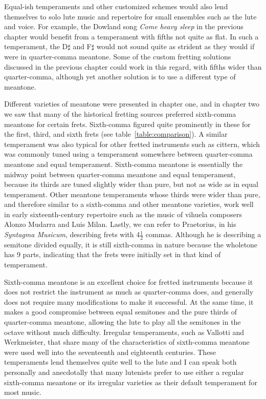 Equal-ish temperaments and other customized schemes would also lend themselves to solo
lute music and repertoire for small ensembles such as the lute and voice. For example,
the Dowland song \textit{Come heavy sleep} in the previous chapter would benefit
from a temperament with fifths not quite as flat.  In such a temperament, 
the D$\sharp$ and F$\sharp$ would not sound quite as strident as
they would if were in quarter-comma meantone. Some of the custom fretting solutions
discussed in the previous chapter could work in this regard, with fifths wider than
quarter-comma, although yet another solution is to use a different type of
meantone.

Different varieties of meantone were presented in chapter one, and in chapter two we saw
that many of the historical fretting sources preferred sixth-comma meantone for certain
frets.   Sixth-comma figured quite prominently in these for the first, third, and sixth
frets (see table~\ref{table:comparison}). A similar temperament was also typical for
other fretted instruments such as cittern, which was commonly tuned using a
temperament somewhere between quarter-comma meantone and equal temperament.
\autocite[12]{PF:1}  Sixth-comma meantone is essentially the midway point between
quarter-comma meantone and equal temperament, because its thirds are tuned slightly
wider than pure, but not as wide as in equal temperament. Other meantone
temperaments whose thirds were wider than pure, and therefore similar to a sixth-comma
and other meantone varieties, work well in early sixteenth-century repertoire such as
the music of vihuela composers Alonzo Mudarra and Luis Milan.\autocite[56]{WH:1}
Lastly, we can refer to Praetorius, in his \textit{Syntagma Musicum}, describing
frets with 4$ \frac{1}{2} $ commas.\autocite[68]{MP:1} Although he is describing a
semitone divided equally, it is still sixth-comma in nature because the wholetone has 9
parts, indicating that the frets were initially set in that kind of temperament.

Sixth-comma meantone is an excellent choice for fretted instruments because it does not restrict the
instrument as much as quarter-comma does, and generally does not require many modifications to make
it successful. At the same time, it makes a good compromise between equal semitones and the pure
thirds of quarter-comma meantone, allowing the lute to play all the semitones in the octave without
much difficulty. Irregular temperaments, such as Vallotti and Werkmeister, that share many of the
characteristics of sixth-comma meantone were used well into the seventeenth and eighteenth
centuries. These temperaments lend themselves quite well to the lute and I can speak both personally
and anecdotally that many lutenists prefer to use either a regular sixth-comma meantone or its
irregular varieties as their default temperament for most music.

